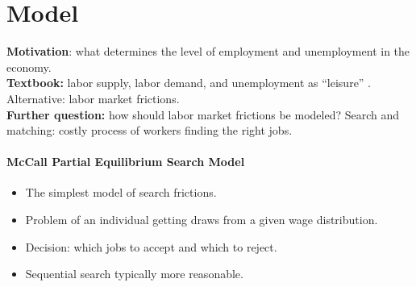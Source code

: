 \documentclass[11pt,a4paper]{article}
\begin{document}
\section{Model}\label{sec:model}
\textbf{Motivation}: what determines the level of employment and unemployment in the economy. \\
\textbf{Textbook:} labor supply, labor demand, and unemployment as ``leisure'' .
Alternative: labor market frictions. \\ 
\textbf{Further question:} how should labor market frictions be modeled?
Search and matching: costly process of workers finding the right jobs.

\paragraph{McCall Partial Equilibrium Search Model}
\begin{itemize}
    \item The simplest model of search frictions.
    \item Problem of an individual getting draws from a given wage distribution.
    \item Decision: which jobs to accept and which to reject. 
    \item Sequential search typically more reasonable.
\end{itemize}
\end{document}
